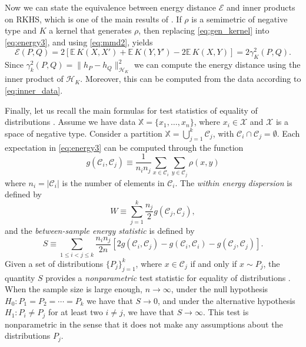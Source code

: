 \documentclass[aps,preprint,nofootinbib,floatfix]{revtex4-1}
\newcommand\Energy{\mathcal{E}}
\newcommand\E{\mathbb{E}}
\newcommand\kk{K}
\newcommand\kkk{h}
\newcommand\Hk{{\mathcal{H}}_{\kk}}
\newcommand\C{{\mathcal{C}}}
\begin{document}
Now we can state the equivalence between energy distance $\Energy$ and
inner products on RKHS, which is one of the main results of
\cite{Sejdinovic2013}. If $\rho$ is a semimetric
of negative type and $\kk$ a kernel that generates $\rho$, then
replacing \eqref{eq:gen_kernel} into
\eqref{eq:energy3}, and using \eqref{eq:mmd2}, yields
\begin{equation} \label{eq:Erho}
\Energy(P, Q) = 
2 \left[ \E \, \kk(X, X') + \E \, \kk(Y, Y') - 2\E \, \kk(X, Y)\right] 
= 2 \gamma_\kk^2(P,Q) .
\end{equation}
Since $\gamma_k^2(P, Q) = \| \kkk_P - \kkk_Q \|^2_{\Hk}$ we
can compute the energy distance using the inner product of $\Hk$. Moreover,
this can be computed from the data according to \eqref{eq:inner_data}.

Finally, let us recall the main formulas for test statistics
of equality of distributions \cite{Szkely2013}. 
Assume we have data $\mathbb{X} = \{ x_1,\dotsc, x_n \}$, where
$x_i \in \mathcal{X}$ and $\mathcal{X}$ is a space of negative type.
Consider a partition $\mathbb{X} = \bigcup_{j=1}^k \C_j$, with
$\C_i \cap \C_j = \emptyset$.
Each expectation in 
\eqref{eq:energy3}
can be computed 
through the function
\begin{equation}
\label{eq:g_def}
g (\C_i, \C_j) \equiv 
\dfrac{1}{n_i n_j}
\sum_{x \in \C_i} 
\sum_{y \in \C_j} \rho(x, y)
\end{equation}
where $n_i = |\C_i|$ is the number of elements in 
$\C_i$. 
The \emph{within energy dispersion} is defined by
\begin{equation}
\label{eq:within}
W \equiv
\sum_{j=1}^{k} \dfrac{n_j}{2} g(\C_j, \C_j),
\end{equation}
and the \emph{between-sample energy statistic} is defined by
\begin{equation}
\label{eq:between}
S \equiv
\sum_{1 \le  i < j \le k } \dfrac{n_i n_{j}}{2 n} \left[
2 g(\C_i, \C_j) - 
g(\C_i, \C_i) - 
g(\C_j, \C_j)
\right].
\end{equation}
Given a set of distributions
$\{ P_j\}_{j=1}^k$, where $x \in \C_j$ if and only if $x \sim P_j$, 
the quantity $S$ provides
a \emph{nonparametric} test statistic for equality of distributions
\cite{Szkely2013}.
When the sample size is large enough, $n\to \infty$,
under the null hypothesis $H_0: P_1=P_2=\dotsm=P_k$ we have that
$S\to 0$, 
and under
the alternative hypothesis $H_1: P_i \ne P_j$ for at least two $i\ne j$, 
we have that $S \to \infty$.
This test is nonparametric in the sense that it does not make any assumptions
about the distributions $P_j$.
\end{document}
